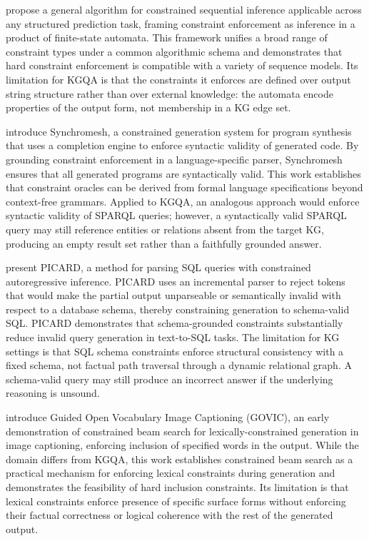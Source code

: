 \citet{deutsch2019constrained} propose a general algorithm for constrained sequential inference applicable across any structured prediction task, framing constraint enforcement as inference in a product of finite-state automata. This framework unifies a broad range of constraint types under a common algorithmic schema and demonstrates that hard constraint enforcement is compatible with a variety of sequence models. Its limitation for KGQA is that the constraints it enforces are defined over output string structure rather than over external knowledge: the automata encode properties of the output form, not membership in a KG edge set.

\citet{poesia2022synchromesh} introduce Synchromesh, a constrained generation system for program synthesis that uses a completion engine to enforce syntactic validity of generated code. By grounding constraint enforcement in a language-specific parser, Synchromesh ensures that all generated programs are syntactically valid. This work establishes that constraint oracles can be derived from formal language specifications beyond context-free grammars. Applied to KGQA, an analogous approach would enforce syntactic validity of SPARQL queries; however, a syntactically valid SPARQL query may still reference entities or relations absent from the target KG, producing an empty result set rather than a faithfully grounded answer.

\citet{scholak2021picard} present PICARD, a method for parsing SQL queries with constrained autoregressive inference. PICARD uses an incremental parser to reject tokens that would make the partial output unparseable or semantically invalid with respect to a database schema, thereby constraining generation to schema-valid SQL. PICARD demonstrates that schema-grounded constraints substantially reduce invalid query generation in text-to-SQL tasks. The limitation for KG settings is that SQL schema constraints enforce structural consistency with a fixed schema, not factual path traversal through a dynamic relational graph. A schema-valid query may still produce an incorrect answer if the underlying reasoning is unsound.

\citet{anderson2017guided} introduce Guided Open Vocabulary Image Captioning (GOVIC), an early demonstration of constrained beam search for lexically-constrained generation in image captioning, enforcing inclusion of specified words in the output. While the domain differs from KGQA, this work establishes constrained beam search as a practical mechanism for enforcing lexical constraints during generation and demonstrates the feasibility of hard inclusion constraints. Its limitation is that lexical constraints enforce presence of specific surface forms without enforcing their factual correctness or logical coherence with the rest of the generated output.

